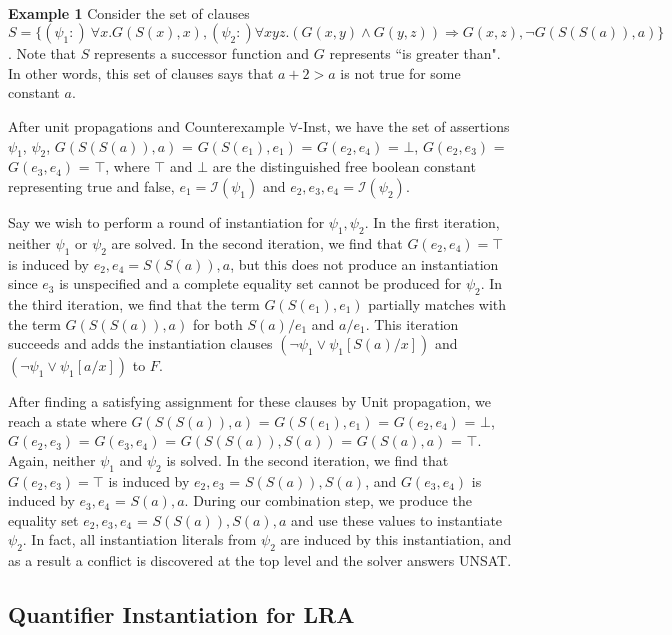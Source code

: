 \documentclass{llncs}
\begin{document}
\ \\

{\bf Example 1}
Consider the set of clauses $S = \{ (\psi_1 :) \ \forall x. G( S( x ), x), (\psi_2 :) \forall xyz. (G(x,y) \wedge G(y,z)) \Rightarrow G(x,z), \neg G( S(S(a)), a) \}$.
Note that $S$ represents a successor function and $G$ represents ``is greater than".  
In other words, this set of clauses says that $a + 2 > a$ is not true for some constant $a$.

After unit propagations and Counterexample $\forall$-Inst, we have the set of assertions $\psi_1$, $\psi_2$, $G( S(S(a)), a)$ = $G( S(e_1), e_1)$ = $G( e_2, e_4 )$ = $\bot$, $G( e_2, e_3 )$ = $G( e_3, e_4 )$ = $\top$, where $\top$ and $\bot$ are the distinguished free boolean constant representing true and false, $e_1 = \mathcal{I}( \psi_1 )$ and $e_2, e_3, e_4 = \mathcal{I}( \psi_2 )$.

Say we wish to perform a round of instantiation for $\psi_1, \psi_2$.
In the first iteration, neither $\psi_1$ or $\psi_2$ are solved.
In the second iteration, we find that $G( e_2, e_4 ) = \top$ is induced by $e_2, e_4 = S(S(a)), a$, but this does not produce an instantiation since $e_3$ is unspecified and a complete equality set cannot be produced for $\psi_2$.
In the third iteration, we find that the term $G( S(e_1), e_1)$ partially matches with the term $G( S(S(a)), a)$ for both $S(a)/e_1$ and $a/e_1$.
This iteration succeeds and adds the instantiation clauses $( \neg \psi_1 \vee \psi_1[S(a)/x])$ and $( \neg \psi_1 \vee \psi_1[a/x])$ to $F$.

After finding a satisfying assignment for these clauses by Unit propagation, we reach a state where $G( S(S(a)), a)$ = $G( S(e_1), e_1)$ = $G( e_2, e_4 )$ = $\bot$, $G( e_2, e_3 )$ = $G( e_3, e_4 )$ = $G(S(S(a)), S(a))$ = $G( S(a), a)$ = $\top$.
Again, neither $\psi_1$ and $\psi_2$ is solved.
In the second iteration, we find that $G( e_2, e_3 ) = \top$ is induced by $e_2,e_3$ = $S(S(a)), S(a)$, and $G( e_3, e_4 )$ is induced by $e_3, e_4$ = $S(a), a$.
During our combination step, we produce the equality set $e_2, e_3, e_4$ = $S(S(a)), S(a), a$ and use these values to instantiate $\psi_2$.
In fact, all instantiation literals from $\psi_2$ are induced by this instantiation, and as a result a conflict is discovered at the top level and the solver answers UNSAT.

\subsection{Quantifier Instantiation for LRA}
\end{document}
